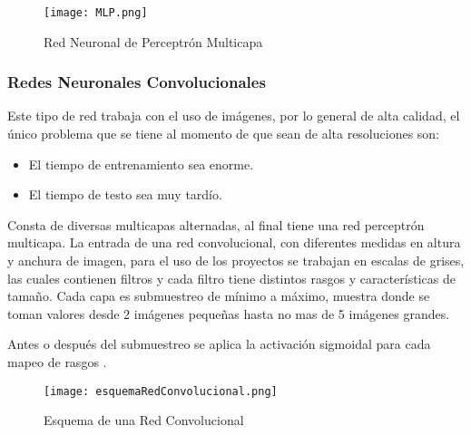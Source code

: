             \begin{figure}[H]
                \centering
                \texttt{[image: MLP.png]}
                \caption{Red Neuronal de Perceptr\'on Multicapa \cite{liu2015}}
                \label{fig:fig1}
            \end{figure}

        \subsubsection{Redes Neuronales Convolucionales}

            Este tipo de red trabaja con el uso de imágenes, por lo general de alta calidad, el \'unico problema que se tiene 
            al momento de que sean de alta resoluciones son:
            \begin{itemize}
                \item El tiempo de entrenamiento sea enorme.
                \item El tiempo de testo sea muy tardío.
            \end{itemize}

            Consta de diversas multicapas alternadas, al final tiene una red perceptr\'on multicapa.
            La entrada de una red convolucional, con diferentes medidas en altura y anchura de imagen, para el uso 
            de los proyectos se trabajan en escalas de grises, las cuales contienen filtros y cada filtro tiene distintos 
            rasgos y características de tamaño. Cada capa es submuestreo de m\'inimo a m\'aximo, muestra donde se toman valores 
            desde 2 im\'agenes pequeñas hasta no mas de 5 im\'agenes grandes.

            Antes o despu\'es del submuestreo se aplica la activaci\'on sigmoidal para cada mapeo de rasgos \cite{duran2017}.

            \begin{figure}[H]
                \centering
                \texttt{[image: esquemaRedConvolucional.png]}
                \caption{Esquema de una Red Convolucional \cite{duran2017}}
                \label{fig:fig2}
            \end{figure}